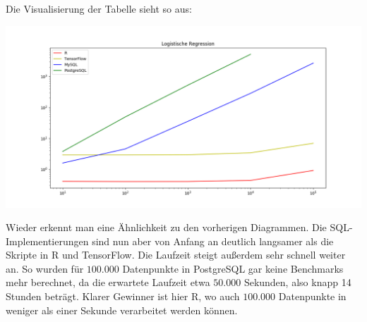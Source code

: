Die Visualisierung der Tabelle sieht so aus:

\includegraphics[width=\textwidth]{logisticRegressionBenchmark}

Wieder erkennt man eine Ähnlichkeit zu den vorherigen Diagrammen. Die SQL-Implementierungen sind nun aber von Anfang an deutlich langsamer als die Skripte in R und TensorFlow. Die Laufzeit steigt außerdem sehr schnell weiter an. So wurden für $100.000$ Datenpunkte in PostgreSQL gar keine Benchmarks mehr berechnet, da die erwartete Laufzeit etwa $50.000$ Sekunden, also knapp 14 Stunden beträgt. Klarer Gewinner ist hier R, wo auch $100.000$ Datenpunkte in weniger als einer Sekunde verarbeitet werden können.
